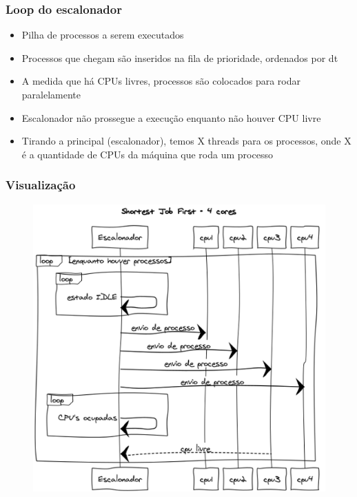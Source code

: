 \documentclass{beamer}
\begin{document}
\begin{frame}
\frametitle{Loop do escalonador}
\begin{itemize}
\item Pilha de processos a serem executados
\item Processos que chegam são inseridos na fila de prioridade, ordenados por dt
\item A medida que há CPUs livres, processos são colocados para rodar paralelamente
\item Escalonador não prossegue a execução enquanto não houver CPU livre
\item Tirando a principal (escalonador), temos X threads para os processos, onde X é a quantidade de CPUs da máquina que roda um processo
\end{itemize}
\end{frame}

\begin{frame}
\frametitle{Visualização}
\begin{figure}
\includegraphics[scale=0.4]{sjf.png}
\end{figure}
\end{frame}
\end{document}
